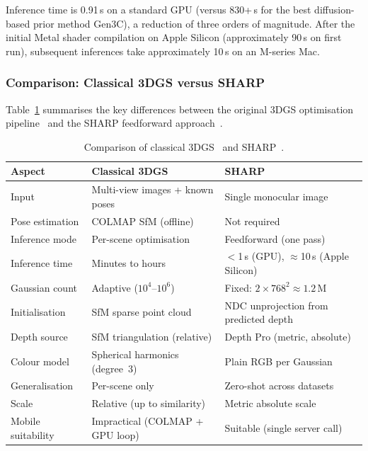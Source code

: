 Inference time is 0.91\,s on a standard GPU (versus 830+\,s for the best diffusion-based prior method Gen3C), a reduction of three orders of magnitude. After the initial Metal shader compilation on Apple Silicon (approximately 90\,s on first run), subsequent inferences take approximately 10\,s on an M-series Mac.

\subsubsection{Comparison: Classical 3DGS versus SHARP}

Table~\ref{tab:3dgs_vs_sharp} summarises the key differences between the original 3DGS optimisation pipeline~\cite{kerbl20233dgs} and the SHARP feedforward approach~\cite{mescheder2025sharp}.

\begin{table}[htbp]
\centering
\caption{Comparison of classical 3DGS~\cite{kerbl20233dgs} and SHARP~\cite{mescheder2025sharp}.}
\label{tab:3dgs_vs_sharp}
\setlength{\tabcolsep}{4pt}
\begin{tabular}{lll}
\toprule
\textbf{Aspect} & \textbf{Classical 3DGS} & \textbf{SHARP} \\
\midrule
Input               & Multi-view images + known poses & Single monocular image \\
Pose estimation     & COLMAP SfM (offline)            & Not required \\
Inference mode      & Per-scene optimisation          & Feedforward (one pass) \\
Inference time      & Minutes to hours                & $<$1\,s (GPU), ${\approx}$10\,s (Apple Silicon) \\
Gaussian count      & Adaptive ($10^4$--$10^6$)       & Fixed: $2 \times 768^2 \approx 1.2$\,M \\
Initialisation      & SfM sparse point cloud          & NDC unprojection from predicted depth \\
Depth source        & SfM triangulation (relative)    & Depth Pro (metric, absolute) \\
Colour model        & Spherical harmonics (degree~3)  & Plain RGB per Gaussian \\
Generalisation      & Per-scene only                  & Zero-shot across datasets \\
Scale               & Relative (up to similarity)     & Metric absolute scale \\
Mobile suitability  & Impractical (COLMAP + GPU loop) & Suitable (single server call) \\
\bottomrule
\end{tabular}
\end{table}


